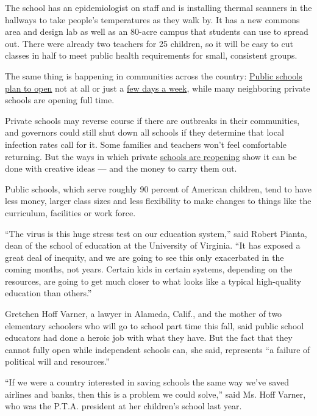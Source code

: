 The school has an epidemiologist on staff and is installing thermal
scanners in the hallways to take people's temperatures as they walk by.
It has a new commons area and design lab as well as an 80-acre campus
that students can use to spread out. There were already two teachers for
25 children, so it will be easy to cut classes in half to meet public
health requirements for small, consistent groups.

The same thing is happening in communities across the country:
\href{https://www.nytimes3xbfgragh.onion/2020/08/03/us/school-closing-coronavirus.html}{Public
schools plan to open} not at all or just a
\href{https://www.nytimes3xbfgragh.onion/2020/07/08/nyregion/nyc-schools-reopening-plan.html}{few
days a week}, while many neighboring private schools are opening full
time.

Private schools may reverse course if there are outbreaks in their
communities, and governors could still shut down all schools if they
determine that local infection rates call for it. Some families and
teachers won't feel comfortable returning. But the ways in which private
\href{https://www.nytimes3xbfgragh.onion/interactive/2020/07/31/us/coronavirus-school-reopening-risk.html}{schools
are reopening} show it can be done with creative ideas --- and the money
to carry them out.

Public schools, which serve roughly 90 percent of American children,
tend to have less money, larger class sizes and less flexibility to make
changes to things like the curriculum, facilities or work force.

``The virus is this huge stress test on our education system,'' said
Robert Pianta, dean of the school of education at the University of
Virginia. ``It has exposed a great deal of inequity, and we are going to
see this only exacerbated in the coming months, not years. Certain kids
in certain systems, depending on the resources, are going to get much
closer to what looks like a typical high-quality education than
others.''

Gretchen Hoff Varner, a lawyer in Alameda, Calif., and the mother of two
elementary schoolers who will go to school part time this fall, said
public school educators had done a heroic job with what they have. But
the fact that they cannot fully open while independent schools can, she
said, represents ``a failure of political will and resources.''

``If we were a country interested in saving schools the same way we've
saved airlines and banks, then this is a problem we could solve,'' said
Ms. Hoff Varner, who was the P.T.A. president at her children's school
last year.

